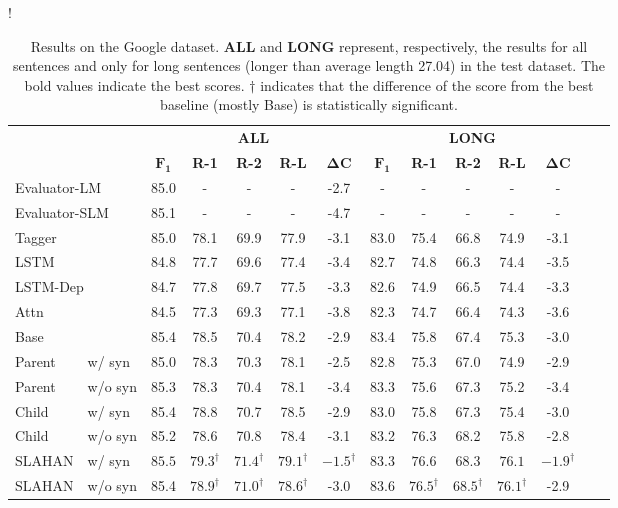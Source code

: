 \documentclass[letterpaper]{article} \usepackage{aaai20}  \usepackage{times}  \usepackage{helvet} \usepackage{courier}  \usepackage[hyphens]{url}  \usepackage{graphicx} \urlstyle{rm} \def\UrlFont{\rm}  \usepackage{graphicx}  \frenchspacing  \setlength{\pdfpagewidth}{8.5in}  \setlength{\pdfpageheight}{11in}  \usepackage{tabu}
\begin{document}
\begin{table*}[t]
\centering
\resizebox {0.8\textwidth} {!} {
\small
\begin{tabular}{llcccccccccccc}
\toprule
& & \multicolumn{5}{c}{\textbf{ALL}} & \multicolumn{5}{c}{\textbf{LONG}}
\\
\cmidrule(lr){3-7} \cmidrule(lr){8-12}
 & & $\mathbf{F_1}$ & \textbf{R-1} & \textbf{R-2} & \textbf{R-L} & $\mathbf{\Delta C}$ & $\mathbf{F_1}$ & \textbf{R-1} & \textbf{R-2} & \textbf{R-L} & $\mathbf{\Delta C}$ \\
\midrule
\multicolumn{2}{l}{Evaluator-LM \cite{zhao-etal-2018-language}}    & 85.0 & - & - & - & -2.7 & - & - & - & - & -\\
\multicolumn{2}{l}{Evaluator-SLM \cite{zhao-etal-2018-language}}    & 85.1 & - & - & - & -4.7 & - & - & - & - & -\\
\midrule
\multicolumn{2}{l}{Tagger}  & 85.0 & 78.1 & 69.9 & 77.9 & -3.1 & 83.0 & 75.4 & 66.8 & 74.9 & -3.1\\
\multicolumn{2}{l}{LSTM}    & 84.8 & 77.7 & 69.6 & 77.4 & -3.4 & 82.7 & 74.8 & 66.3 & 74.4 & -3.5\\
\multicolumn{2}{l}{LSTM-Dep}& 84.7 & 77.8 & 69.7 & 77.5 & -3.3 & 82.6 & 74.9 & 66.5 & 74.4 & -3.3\\
\multicolumn{2}{l}{Attn}    & 84.5 & 77.3 & 69.3 & 77.1 & -3.8 & 82.3 & 74.7 & 66.4 & 74.3 & -3.6\\
\multicolumn{2}{l}{Base}    & 85.4 & 78.5 & 70.4 & 78.2 & -2.9 & 83.4 & 75.8 & 67.4 & 75.3 & -3.0\\
Parent & w/ syn             & 85.0 & 78.3 & 70.3 & 78.1 & -2.5 & 82.8 & 75.3 & 67.0 & 74.9 & -2.9\\
Parent & w/o syn            & 85.3 & 78.3 & 70.4 & 78.1 & -3.4 & 83.3 & 75.6 & 67.3 & 75.2 & -3.4\\
\midrule
Child & w/ syn              & 85.4 & 78.8 & 70.7 & 78.5 & -2.9 & 83.0 & 75.8 & 67.3 & 75.4 & -3.0\\
Child & w/o syn             & 85.2 & 78.6 & 70.8 & 78.4 & -3.1 & 83.2 & 76.3 & 68.2 & 75.8 & -2.8\\
SLAHAN & w/ syn             & $\mathbf{85.5}$ & $\mathbf{79.3}^{\dagger}$ & $\mathbf{71.4}^{\dagger}$ & $\mathbf{79.1}^{\dagger}$ & $\mathbf{-1.5}^{\dagger}$ & 83.3 & $\mathbf{76.6}$ & 68.3 & $\mathbf{76.1}$ & $\mathbf{-1.9}^{\dagger}$\\
SLAHAN & w/o syn            & 85.4 & $78.9^{\dagger}$ & $71.0^{\dagger}$ & $78.6^{\dagger}$ & -3.0 & $\mathbf{83.6}$ & $76.5^{\dagger}$ & $\mathbf{68.5}^{\dagger}$ & $\mathbf{76.1}^{\dagger}$ & -2.9\\
\bottomrule
\end{tabular}
}
    \caption{Results on the Google dataset. $\mathbf{ALL}$ and $\mathbf{LONG}$ represent, respectively, the results for all sentences and only for long sentences (longer than average length 27.04) in the test dataset. The bold values indicate the best scores. $\dagger$ indicates that the difference of the score from the best baseline (mostly Base) is statistically significant.\footnotemark[8]} \label{tb:eval:google}
\end{table*}
\end{document}
